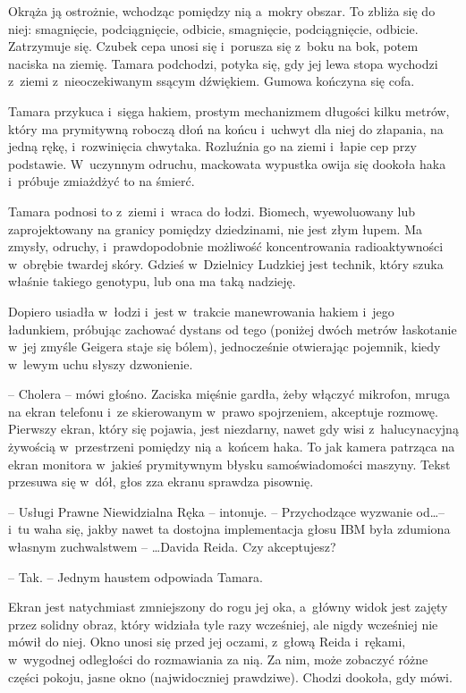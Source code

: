 \documentclass[oneside,polish,11pt,sfheadings]{mwbk}
\begin{document}
Okrąża ją ostrożnie, wchodząc pomiędzy nią a~mokry obszar. To zbliża się
do niej: smagnięcie, podciągnięcie, odbicie, smagnięcie, podciągnięcie,
odbicie. Zatrzymuje się. Czubek cepa unosi się i~porusza się z~boku na
bok, potem naciska na ziemię. Tamara podchodzi, potyka się, gdy jej lewa
stopa wychodzi z~ziemi z~nieoczekiwanym ssącym dźwiękiem. Gumowa
kończyna się cofa.

Tamara przykuca i~sięga hakiem, prostym mechanizmem długości kilku
metrów, który ma prymitywną roboczą dłoń na końcu i~uchwyt dla niej do
złapania, na jedną rękę, i~rozwinięcia chwytaka. Rozluźnia go na ziemi i~łapie cep przy podstawie. W~uczynnym odruchu, mackowata wypustka owija
się dookoła haka i~próbuje zmiażdżyć to na śmierć.

Tamara podnosi to z~ziemi i~wraca do łodzi. Biomech, wyewoluowany lub
zaprojektowany na granicy pomiędzy dziedzinami, nie jest złym łupem. Ma
zmysły, odruchy, i~prawdopodobnie możliwość koncentrowania
radioaktywności w~obrębie twardej skóry. Gdzieś w~Dzielnicy Ludzkiej
jest technik, który szuka właśnie takiego genotypu, lub ona ma taką
nadzieję.

Dopiero usiadła w~łodzi i~jest w~trakcie manewrowania hakiem i~jego
ładunkiem, próbując zachować dystans od tego (poniżej dwóch metrów
łaskotanie w~jej zmyśle Geigera staje się bólem), jednocześnie
otwierając pojemnik, kiedy w~lewym uchu słyszy dzwonienie.

-- Cholera -- mówi głośno. Zaciska mięśnie gardła, żeby włączyć mikrofon,
mruga na ekran telefonu i~ze skierowanym w~prawo spojrzeniem, akceptuje
rozmowę. Pierwszy ekran, który się pojawia, jest niezdarny, nawet gdy
wisi z~halucynacyjną żywością w~przestrzeni pomiędzy nią a~końcem haka.
To jak kamera patrząca na ekran monitora w~jakieś prymitywnym błysku
samoświadomości maszyny. Tekst przesuwa się w~dół, głos zza ekranu
sprawdza pisownię.

-- Usługi Prawne Niewidzialna Ręka -- intonuje. -- Przychodzące wyzwanie
od\ldots -- i~tu waha się, jakby nawet ta dostojna implementacja głosu IBM
była zdumiona własnym zuchwalstwem -- \ldots Davida Reida. Czy akceptujesz?

-- Tak. -- Jednym haustem odpowiada Tamara.

Ekran jest natychmiast zmniejszony do rogu jej oka, a~główny widok jest
zajęty przez solidny obraz, który widziała tyle razy wcześniej, ale
nigdy wcześniej nie mówił do niej. Okno unosi się przed jej oczami, z~głową Reida i~rękami, w~wygodnej odległości do rozmawiania za nią. Za
nim, może zobaczyć różne części pokoju, jasne okno (najwidoczniej
prawdziwe). Chodzi dookoła, gdy mówi.
\end{document}
